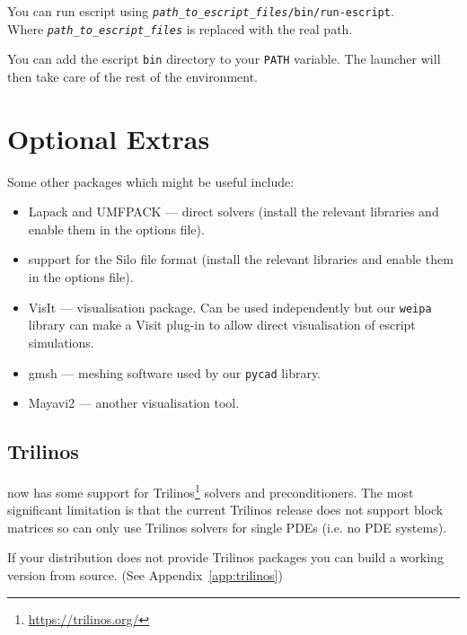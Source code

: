 You can run escript using \texttt{\textit{path_to_escript_files}/bin/run-escript}.\\
Where \texttt{\textit{path_to_escript_files}} is replaced with the real path.

\begin{optionalstep}
You can add the escript \texttt{bin} directory to your \texttt{PATH} variable.
The launcher will then take care of the rest of the environment.
\end{optionalstep}

\section{Optional Extras}

Some other packages which might be useful include:
\begin{itemize}
 \item Lapack and UMFPACK --- direct solvers (install the relevant libraries and enable them in the options file).
 \item support for the Silo file format (install the relevant libraries and enable them in the options file).
 \item VisIt --- visualisation package. Can be used independently but our \texttt{weipa} library can make a Visit
plug-in to allow direct visualisation of escript simulations.
 \item gmsh --- meshing software used by our \texttt{pycad} library.
 \item Mayavi2 --- another visualisation tool.
\end{itemize}


\subsection{Trilinos}
\escript now has some support for Trilinos\footnote{\url{https://trilinos.org/}}
solvers and preconditioners.
The most significant limitation is that the current Trilinos release does not
support block matrices so \escript can only use Trilinos solvers for single
PDEs (i.e. no PDE systems).

If your distribution does not provide Trilinos packages you can build a working
version from source. (See Appendix~\ref{app:trilinos})
